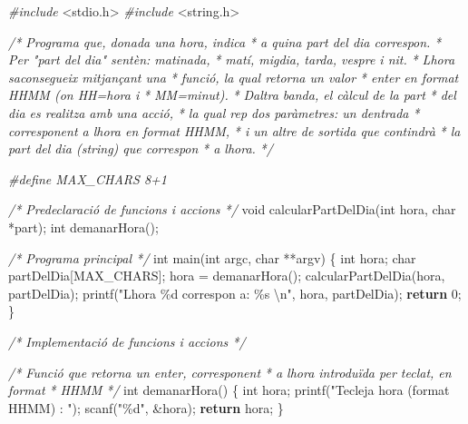 \documentclass[]{book}
\newenvironment{Shaded}{\begin{snugshade}}{\end{snugshade}}
\newcommand{\CommentTok}[1]{\textcolor[rgb]{0.56,0.35,0.01}{\textit{#1}}}
\newcommand{\ControlFlowTok}[1]{\textcolor[rgb]{0.13,0.29,0.53}{\textbf{#1}}}
\newcommand{\DataTypeTok}[1]{\textcolor[rgb]{0.13,0.29,0.53}{#1}}
\newcommand{\DecValTok}[1]{\textcolor[rgb]{0.00,0.00,0.81}{#1}}
\newcommand{\ImportTok}[1]{#1}
\newcommand{\NormalTok}[1]{#1}
\newcommand{\PreprocessorTok}[1]{\textcolor[rgb]{0.56,0.35,0.01}{\textit{#1}}}
\newcommand{\SpecialCharTok}[1]{\textcolor[rgb]{0.00,0.00,0.00}{#1}}
\newcommand{\StringTok}[1]{\textcolor[rgb]{0.31,0.60,0.02}{#1}}
\begin{document}
\begin{Shaded}
\begin{Highlighting}[]
\PreprocessorTok{\#include }\ImportTok{\textless{}stdio.h\textgreater{}}
\PreprocessorTok{\#include }\ImportTok{\textless{}string.h\textgreater{}}

\CommentTok{/* Programa que, donada una hora, indica}
\CommentTok{ * a quina part del dia correspon.}
\CommentTok{ * Per "part del dia" s\textquotesingle{}entèn: matinada,}
\CommentTok{ * matí, migdia, tarda, vespre i nit.}
\CommentTok{ * L\textquotesingle{}hora s\textquotesingle{}aconsegueix mitjançant una}
\CommentTok{ * funció, la qual retorna un valor}
\CommentTok{ * enter en format HHMM (on HH=hora i}
\CommentTok{ * MM=minut).}
\CommentTok{ * D\textquotesingle{}altra banda, el càlcul de la part}
\CommentTok{ * del dia es realitza amb una acció,}
\CommentTok{ * la qual rep dos paràmetres: un d\textquotesingle{}entrada}
\CommentTok{ * corresponent a l\textquotesingle{}hora en format HHMM, }
\CommentTok{ * i un altre de sortida que contindrà}
\CommentTok{ * la part del dia (string) que correspon}
\CommentTok{ * a l\textquotesingle{}hora.}
\CommentTok{ */}

\PreprocessorTok{\#define MAX\_CHARS 8+1}

\CommentTok{/* Predeclaració de funcions i accions */}
\DataTypeTok{void}\NormalTok{ calcularPartDelDia(}\DataTypeTok{int}\NormalTok{ hora, }\DataTypeTok{char}\NormalTok{ *part);}
\DataTypeTok{int}\NormalTok{ demanarHora();}

\CommentTok{/* Programa principal */}
\DataTypeTok{int}\NormalTok{ main(}\DataTypeTok{int}\NormalTok{ argc, }\DataTypeTok{char}\NormalTok{ **argv) \{}
    \DataTypeTok{int}\NormalTok{ hora;}
    \DataTypeTok{char}\NormalTok{ partDelDia[MAX\_CHARS];}
\NormalTok{    hora = demanarHora();}
\NormalTok{    calcularPartDelDia(hora, partDelDia);}
\NormalTok{    printf(}\StringTok{"L\textquotesingle{}hora \%d correspon a: \%s }\SpecialCharTok{\textbackslash{}n}\StringTok{"}\NormalTok{, hora, partDelDia);}
    \ControlFlowTok{return} \DecValTok{0}\NormalTok{;}
\NormalTok{\}}

\CommentTok{/* Implementació de funcions i accions */}

\CommentTok{/* Funció que retorna un enter, corresponent}
\CommentTok{ * a l\textquotesingle{}hora introduïda per teclat, en format}
\CommentTok{ * HHMM}
\CommentTok{ */}
\DataTypeTok{int}\NormalTok{ demanarHora() \{}
    \DataTypeTok{int}\NormalTok{ hora;}
\NormalTok{    printf(}\StringTok{"Tecleja hora (format HHMM) : "}\NormalTok{);}
\NormalTok{    scanf(}\StringTok{"\%d"}\NormalTok{, \&hora);}
    \ControlFlowTok{return}\NormalTok{ hora;}
\NormalTok{\}}


\end{Highlighting}
\end{Shaded}
\end{document}
